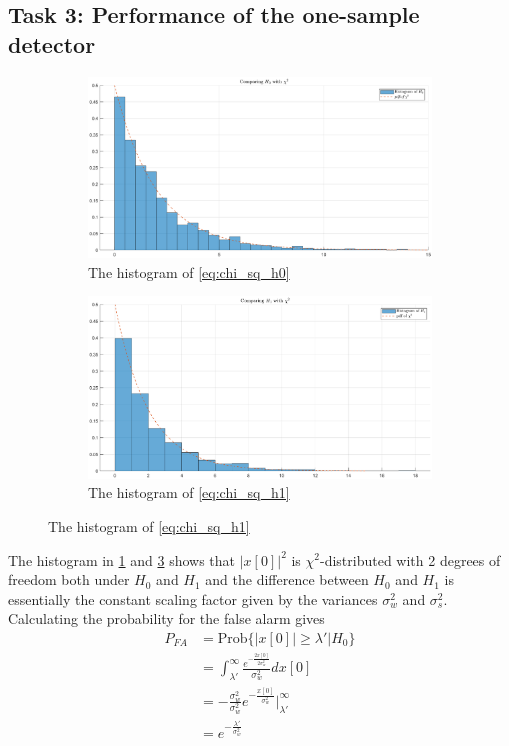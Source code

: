 \subsection{Task 3: Performance of the one-sample detector}
\begin{figure}[ht]
    \begin{subfigure}{.5\textwidth}
        \centering
        \includegraphics[width=.8\linewidth]{figures/chi_square_h0.eps}  
        \caption{The histogram of \eqref{eq:chi_sq_h0}}
        \label{fig:chi_sq_h0}
    \end{subfigure}
    \begin{subfigure}{.5\textwidth}
        \centering
        \includegraphics[width=.8\linewidth]{figures/chi_square_h1.eps}  
        \caption{The histogram of \eqref{eq:chi_sq_h1}}
        \label{fig:chi_sq_h1}
    \end{subfigure}
\end{figure}
The histogram in \ref{fig:chi_sq_h0} and \ref{fig:chi_sq_h1} shows that $|x[0]|^2$ is $\chi^2$-distributed with 2 degrees of freedom both under $H_0$ and $H_1$ and the difference between $H_0$ and $H_1$ is essentially the constant scaling factor given by the variances $\sigma_w^2$ and $\sigma_s^2$.
Calculating the probability for the false alarm gives
\begin{align}
    P_{FA} & = \text{Prob}\{|x[0]|\geq\lambda'\big\vert H_0\}\nonumber\\
    & = \int_{\lambda'}^{\infty}\frac{e^{-\frac{2x[0]}{2\sigma_w^2}}}{\sigma_w^2}dx[0]\nonumber\\
    & = -\frac{\sigma_w^2}{\sigma_w^2}e^{-\frac{x[0]}{\sigma_w^2}}\bigg\rvert_{\lambda'}^{\infty}\nonumber\\
    & = e^{-\frac{\lambda'}{\sigma_w^2}}\nonumber
\end{align}
